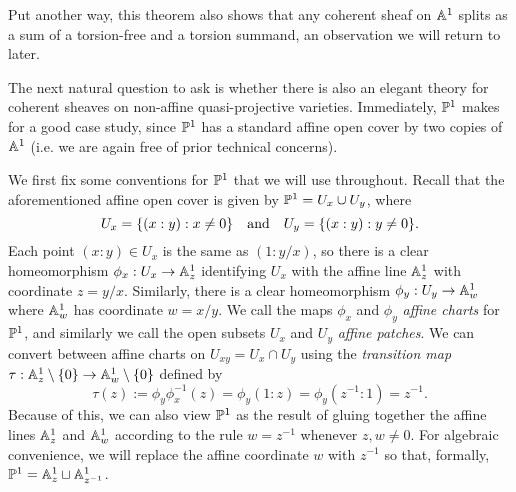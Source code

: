 Put another way, this theorem also shows that any coherent sheaf on
$\mathbb{A}^{{1}}$ splits as a sum of a torsion-free and a torsion summand, an
observation we will return to later.

The next natural question to ask is whether there is also an elegant
theory for coherent sheaves on non-affine quasi-projective varieties.
Immediately, $\mathbb{P}^{{1}}$ makes for a good case study, since $\mathbb{P}^{{1}}$
has a standard affine open cover by two copies of $\mathbb{A}^{{1}}$ (i.e. we
are again free of prior technical concerns).

We first fix some conventions for $\mathbb{P}^{{1}}$ that we will use throughout.
Recall that the aforementioned affine open cover is given by
$\mathbb{P}^{{1}} = U_x \cup U_y$, where
\[
  U_x = \{(x : y): x \neq 0\} \quad \text{and} \quad U_y = \{(x : y): y \neq 0\}.
\]
Each point $(x : y) \in U_x$ is the same as $(1 : y/x)$, so there is
a clear homeomorphism $\phi_x: U_x \to \mathbb{A}^{{1}}_z$ identifying $U_x$
with the affine line $\mathbb{A}^{{1}}_z$ with coordinate $z = y/x$.
Similarly, there is a clear homeomorphism $\phi_y: U_y \to
\mathbb{A}^{{1}}_{w}$ where $\mathbb{A}^{{1}}_{w}$ has coordinate $w = x/y$.
We call the maps $\phi_x$ and $\phi_y$ \emph{affine charts} for
$\mathbb{P}^{{1}}$, and similarly we call the open subsets $U_x$ and $U_y$
\emph{affine patches}.
We can convert between affine charts on $U_{xy} = U_x \cap U_y$ using
the \emph{transition map} $\tau: \mathbb{A}^{{1}}_z \setminus \{0\} \to
\mathbb{A}^{{1}}_w \setminus \{0\}$ defined by
\[
  \tau(z)
  := \phi_y \phi_x^{-1}(z)
  = \phi_y(1 : z)
  = \phi_y(z^{-1} : 1)
  = z^{-1}.
\]
Because of this, we can also view $\mathbb{P}^{{1}}$ as the result of gluing
together the affine lines $\mathbb{A}^{{1}}_z$ and $\mathbb{A}^{{1}}_w$ according to
the rule $w = z^{-1}$ whenever $z, w \neq 0$.
For algebraic convenience, we will replace the affine coordinate $w$
with $z^{-1}$ so that, formally, $\mathbb{P}^{{1}} = \mathbb{A}^{{1}}_z \sqcup \mathbb{A}^{{1}}_{z^{-1}}$.

